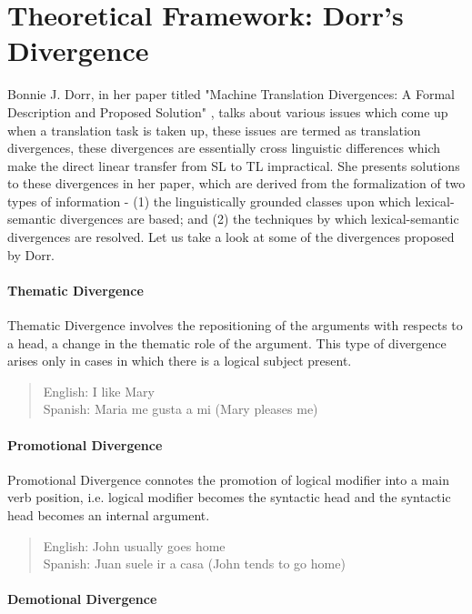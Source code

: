 \section{Theoretical Framework: Dorr's Divergence}

Bonnie J. Dorr, in her paper titled "Machine Translation Divergences: A Formal Description and Proposed Solution" \cite{dorr1994machine}, talks about various issues which come up when a translation task is taken up, these issues are termed as translation divergences, these divergences are essentially cross linguistic differences which make the direct linear transfer from SL to TL impractical. She presents solutions to these divergences in her paper, which are derived from the formalization of two types of information - (1) the linguistically grounded classes upon which lexical-semantic divergences are based; and (2) the techniques by which lexical-semantic divergences are resolved. Let us take a look at some of the divergences proposed by Dorr.

\paragraph{Thematic Divergence}

Thematic Divergence involves the repositioning of the arguments with respects to a head, a change in the thematic role of the argument. This type of divergence arises only in cases in which there is a logical subject present.

\begin{quote}
English: I like Mary \\
Spanish: Maria me gusta a mi (Mary pleases me)    
\end{quote}

\paragraph{Promotional Divergence}

Promotional Divergence connotes the promotion of logical modifier into a main verb position, i.e. logical modifier becomes the syntactic head and the syntactic head becomes an internal argument.

\begin{quote}
English: John usually goes home \\
Spanish: Juan suele ir a casa (John tends to go home)
\end{quote}

\paragraph{Demotional Divergence}

